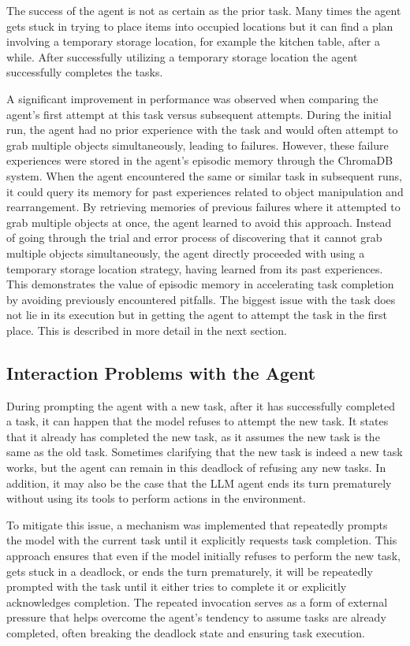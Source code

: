 \documentclass[../report.tex]{subfiles}
\begin{document}
The success of the agent is not as certain as the prior task. Many times the agent gets stuck in trying to place items into occupied locations but it can find a plan involving a temporary storage location, for example the kitchen table, after a while. After successfully utilizing a temporary storage location the agent successfully completes the tasks.

A significant improvement in performance was observed when comparing the agent's first attempt at this task versus subsequent attempts. During the initial run, the agent had no prior experience with the task and would often attempt to grab multiple objects simultaneously, leading to failures. However, these failure experiences were stored in the agent's episodic memory through the ChromaDB system. When the agent encountered the same or similar task in subsequent runs, it could query its memory for past experiences related to object manipulation and rearrangement. By retrieving memories of previous failures where it attempted to grab multiple objects at once, the agent learned to avoid this approach. Instead of going through the trial and error process of discovering that it cannot grab multiple objects simultaneously, the agent directly proceeded with using a temporary storage location strategy, having learned from its past experiences. This demonstrates the value of episodic memory in accelerating task completion by avoiding previously encountered pitfalls. The biggest issue with the task does not lie in its execution but in getting the agent to attempt the task in the first place. This is described in more detail in the next section.

\subsection{Interaction Problems with the Agent}
During prompting the agent with a new task, after it has successfully completed a task, it can happen that the model refuses to attempt the new task. It states that it already has completed the new task, as it assumes the new task is the same as the old task. Sometimes clarifying that the new task is indeed a new task works, but the agent can remain in this deadlock of refusing any new tasks. In addition, it may also be the case that the LLM agent ends its turn prematurely without using its tools to perform actions in the environment.

To mitigate this issue, a mechanism was implemented that repeatedly prompts the model with the current task until it explicitly requests task completion. This approach ensures that even if the model initially refuses to perform the new task, gets stuck in a deadlock, or ends the turn prematurely, it will be repeatedly prompted with the task until it either tries to complete it or explicitly acknowledges completion. The repeated invocation serves as a form of external pressure that helps overcome the agent's tendency to assume tasks are already completed, often breaking the deadlock state and ensuring task execution.
\end{document}
